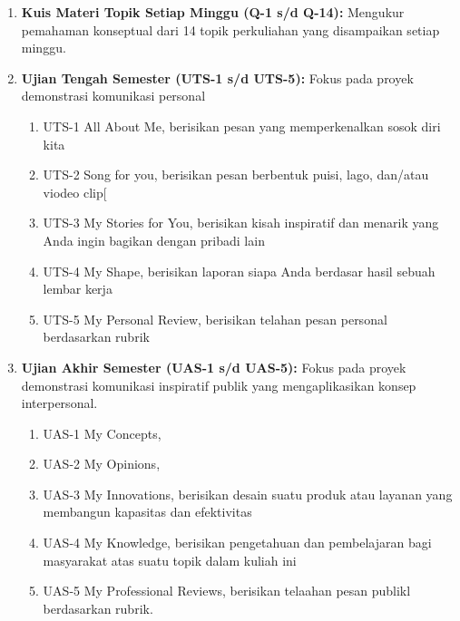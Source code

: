 \documentclass[
  letterpaper,
  DIV=11,
  numbers=noendperiod]{scrreprt}
\providecommand{\tightlist}{%
  \setlength{\itemsep}{0pt}\setlength{\parskip}{0pt}}
\begin{document}
\begin{enumerate}
\def\labelenumi{\arabic{enumi}.}
\tightlist
\item
  \textbf{Kuis Materi Topik Setiap Minggu (Q-1 s/d Q-14):} Mengukur
  pemahaman konseptual dari 14 topik perkuliahan yang disampaikan setiap
  minggu.
\item
  \textbf{Ujian Tengah Semester (UTS-1 s/d UTS-5):} Fokus pada proyek
  demonstrasi komunikasi personal

  \begin{enumerate}
  \def\labelenumii{\arabic{enumii}.}
  \tightlist
  \item
    UTS-1 All About Me, berisikan pesan yang memperkenalkan sosok diri
    kita
  \item
    UTS-2 Song for you, berisikan pesan berbentuk puisi, lago, dan/atau
    viodeo clip{[}
  \item
    UTS-3 My Stories for You, berisikan kisah inspiratif dan menarik
    yang Anda ingin bagikan dengan pribadi lain
  \item
    UTS-4 My Shape, berisikan laporan siapa Anda berdasar hasil sebuah
    lembar kerja
  \item
    UTS-5 My Personal Review, berisikan telahan pesan personal
    berdasarkan rubrik
  \end{enumerate}
\item
  \textbf{Ujian Akhir Semester (UAS-1 s/d UAS-5):} Fokus pada proyek
  demonstrasi komunikasi inspiratif publik yang mengaplikasikan konsep
  interpersonal.

  \begin{enumerate}
  \def\labelenumii{\arabic{enumii}.}
  \tightlist
  \item
    UAS-1 My Concepts,
  \item
    UAS-2 My Opinions,
  \item
    UAS-3 My Innovations, berisikan desain suatu produk atau layanan
    yang membangun kapasitas dan efektivitas
  \item
    UAS-4 My Knowledge, berisikan pengetahuan dan pembelajaran bagi
    masyarakat atas suatu topik dalam kuliah ini
  \item
    UAS-5 My Professional Reviews, berisikan telaahan pesan publikl
    berdasarkan rubrik.
  \end{enumerate}
\end{enumerate}
\end{document}
